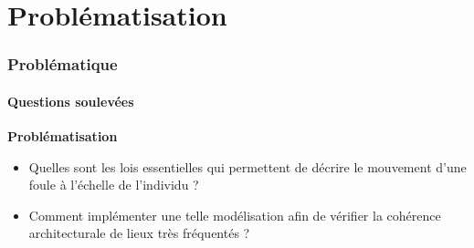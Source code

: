 \section{Problématisation}

\begin{frame}
\frametitle{Problématique}
\framesubtitle{Questions soulevées}

\textbf{Problématisation}

\begin{itemize}
    \item <2-> Quelles sont les lois essentielles qui permettent de décrire le mouvement d'une foule à l'échelle de l'individu ?
    \bigskip
    \item <3-> Comment implémenter une telle modélisation afin de vérifier la cohérence architecturale de lieux très fréquentés ?

\end{itemize}
\end{frame}

